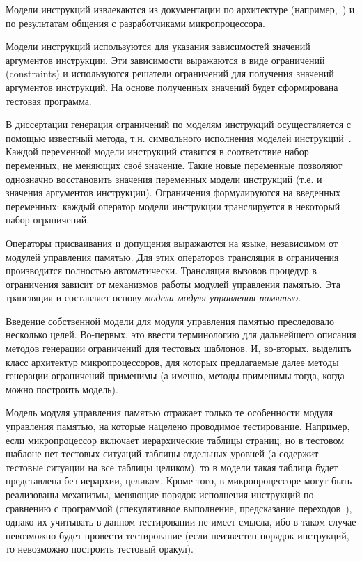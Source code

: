 Модели инструкций извлекаются из документации по архитектуре
(например,~\cite{mips64_II}) и по результатам общения с
разработчиками микропроцессора.

Модели инструкций используются для указания зависимостей значений
аргументов инструкции. Эти зависимости выражаются в виде ограничений
(constraints) и используются решатели ограничений для получения
значений аргументов инструкций. На основе полученных значений будет
сформирована тестовая программа.

В диссертации генерация ограничений по моделям инструкций
осуществляется с помощью известный метода, т.н. символьного
исполнения моделей инструкций~\cite{my_syrcose_2008}. Каждой
переменной модели инструкций ставится в соответствие набор
переменных, не меняющих своё значение. Такие новые переменные
позволяют однозначно восстановить значения переменных модели
инструкций (т.е. и значения аргументов инструкции). Ограничения
формулируются на введенных переменных: каждый оператор модели
инструкции транслируется в некоторый набор ограничений.

Операторы присваивания и допущения выражаются на языке, независимом
от модулей управления памятью. Для этих операторов трансляция в
ограничения производится полностью автоматически. Трансляция вызовов
процедур в ограничения зависит от механизмов работы модулей
управления памятью. Эта трансляция и составляет основу \emph{модели
модуля управления памятью}.

Введение собственной модели для модуля управления памятью
преследовало несколько целей. Во-первых, это ввести терминологию для
дальнейшего описания методов генерации ограничений для тестовых
шаблонов. И, во-вторых, выделить класс архитектур микропроцессоров,
для которых предлагаемые далее методы генерации ограничений
применимы (а именно, методы применимы тогда, когда можно построить
модель).

Модель модуля управления памятью отражает только те особенности
модуля управления памятью, на которые нацелено проводимое
тестирование. Например, если микропроцессор включает иерархические
таблицы страниц, но в тестовом шаблоне нет тестовых ситуаций таблицы
отдельных уровней (а содержит тестовые ситуации на все таблицы
целиком), то в модели такая таблица будет представлена без иерархии,
целиком. Кроме того, в микропроцессоре могут быть реализованы
механизмы, меняющие порядок исполнения инструкций по сравнению с
программой (спекулятивное выполнение, предсказание
переходов~\cite{Pasko}), однако их учитывать в данном тестировании
не имеет смысла, ибо в таком случае невозможно будет провести
тестирование (если неизвестен порядок инструкций, то невозможно
построить тестовый оракул).

